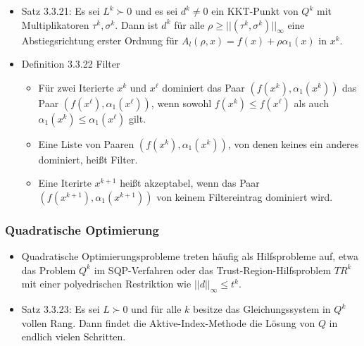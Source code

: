 \documentclass[paper=a4, fontsize=11pt]{scrartcl} %
\numberwithin{equation}{section} %
\numberwithin{figure}{section} %
\numberwithin{table}{section} %
\begin{document}
\begin{itemize}
  \item Satz 3.3.21: Es sei $L^k \succ 0$ und es sei $d^k \neq 0$ ein KKT-Punkt von $Q^k$ mit Multiplikatoren $\tau^k, \sigma^k$. Dann ist $d^k$ für alle $\rho \ge ||(\tau^k,\sigma^k)||_\infty$ eine Abstiegsrichtung erster Ordnung für $A_l(\rho,x) = f(x) + \rho \alpha_1(x)$ in $x^k$.
  \item Definition 3.3.22 Filter
  \begin{itemize}
    \item Für zwei Iterierte $x^k$ und $x^\ell$ dominiert das Paar $(f(x^k),\alpha_1(x^k))$ das Paar $(f(x^\ell),\alpha_1(x^\ell))$, wenn sowohl $f(x^k) \le f(x^\ell)$ als auch $\alpha_1(x^k) \le \alpha_1(x^\ell)$ gilt.
    \item Eine Liste von Paaren $(f(x^k),\alpha_1(x^k))$, von denen keines ein anderes dominiert, heißt Filter.
    \item Eine Iterirte $x^{k+1}$ heißt akzeptabel, wenn das Paar $(f(x^{k+1}),\alpha_1(x^{k+1}))$ von keinem Filtereintrag dominiert wird.
  \end{itemize}
\end{itemize}

\subsubsection{Quadratische Optimierung}

\begin{itemize}
  \item Quadratische Optimierungsprobleme treten häufig als Hilfsprobleme auf, etwa das Problem $Q^k$ im SQP-Verfahren oder das Trust-Region-Hilfsproblem $TR^k$ mit einer polyedrischen Restriktion wie $||d||_\infty \le t^k$.
  \item Satz 3.3.23: Es sei $L \succ 0$ und für alle $k$ besitze das Gleichungssystem in $Q^k$ vollen Rang. Dann findet die Aktive-Index-Methode die Lösung von $Q$ in endlich vielen Schritten.
\end{itemize}
\end{document}

